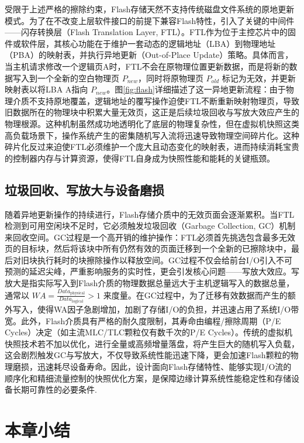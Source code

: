 受限于上述严格的擦除约束，Flash存储天然不支持传统磁盘文件系统的原地更新模式。为了在不改变上层软件接口的前提下兼容Flash特性，引入了关键的中间件——闪存转换层（Flash Translation Layer, FTL）。FTL作为位于主控芯片中的固件或软件层，其核心功能在于维护一套动态的逻辑地址（LBA）到物理地址（PBA）的映射表，并执行异地更新（Out-of-Place Update）策略。具体而言，当主机请求修改一个逻辑页A时，FTL不会在原物理位置更新数据，而是将新的数据写入到一个全新的空白物理页 $P_{new}$，同时将原物理页 $P_{old}$ 标记为无效，并更新映射表以将LBA A指向 $P_{new}$。图\ref{fig:flash}详细描述了这一异地更新流程：由于物理介质不支持原地覆盖，逻辑地址的覆写操作迫使FTL不断重新映射物理页，导致旧数据所在的物理块中积累大量无效页，这正是后续垃圾回收与写放大效应产生的物理根源\cite{hwang2015f2fs, agrawal2008design}。这种机制虽然成功地透明化了底层的物理复杂性，但在虚拟机快照这类高负载场景下，操作系统产生的密集随机写入流将迅速导致物理空间碎片化。这种碎片化反过来迫使FTL必须维护一个庞大且动态变化的映射表，进而持续消耗宝贵的控制器内存与计算资源，使得FTL自身成为快照性能和能耗的关键瓶颈\cite{luo2018wisckey}。

\subsection{垃圾回收、写放大与设备磨损}

随着异地更新操作的持续进行，Flash存储介质中的无效页面会逐渐累积。当FTL检测到可用空闲块不足时，它必须触发垃圾回收（Garbage Collection, GC）机制来回收空间。GC过程是一个高开销的维护操作：FTL必须首先挑选包含最多无效页的目标块，然后将该块中所有仍然有效的页面迁移到一个全新的已擦除块中，最后对旧块执行耗时的块擦除操作以释放空间。GC过程不仅会给前台I/O引入不可预测的延迟尖峰，严重影响服务的实时性，更会引发核心问题——写放大效应。写放大是指实际写入到Flash介质的物理数据总量远大于主机逻辑写入的数据总量，通常以 $WA = \frac{Data_{\text{physical}}}{Data_{\text{logical}}} > 1$ 来度量。在GC过程中，为了迁移有效数据而产生的额外写入，使得WA因子急剧增加，加剧了存储I/O的负担，并迅速占用了系统I/O带宽。此外，Flash介质具有严格的耐久度限制，其寿命由编程/擦除周期（P/E Cycles）决定（如主流MLC/TLC颗粒仅有数千次的P/E Cycles）\cite{agrawal2008design,gal2012exploring}。传统的虚拟机快照技术若不加以优化，进行全量或高频增量落盘，将产生巨大的随机写入负载，这会剧烈触发GC与写放大，不仅导致系统性能迅速下降，更会加速Flash颗粒的物理磨损，迅速耗尽设备寿命。因此，设计面向Flash存储特性、能够实现I/O流的顺序化和精细流量控制的快照优化方案，是保障边缘计算系统性能稳定性和存储设备长期可靠性的必要条件\cite{zhong2016flic}.


\section{本章小结}

